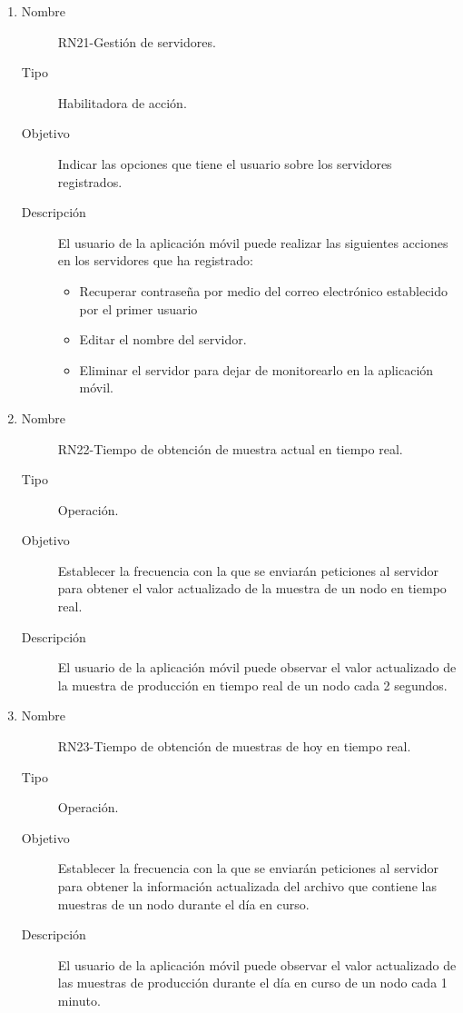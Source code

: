 \begin{enumerate}[label=RN\arabic*.]
\item \label{RN21}
		\begin{description}
			\item[Nombre] RN21-Gestión de servidores.
			\item[Tipo] Habilitadora de acción.
			\item[Objetivo] Indicar las opciones que tiene el usuario sobre los servidores registrados.
			\item[Descripción] El usuario de la aplicación móvil puede realizar las siguientes acciones en los servidores que ha registrado:
			\begin{itemize}
		 		\item Recuperar contraseña por medio del correo electrónico establecido por el primer usuario
		 		\item Editar el nombre del servidor.
		 		\item Eliminar el servidor para dejar de monitorearlo en la aplicación móvil.
		    \end{itemize}
		\end{description}
		
\item \label{RN22}
		\begin{description}
			\item[Nombre] RN22-Tiempo de obtención de muestra actual en tiempo real.
			\item[Tipo] Operación.
			\item[Objetivo] Establecer la frecuencia con la que se enviarán peticiones al servidor para obtener el valor actualizado de la muestra de un nodo en tiempo real.
			\item[Descripción] El usuario de la aplicación móvil puede observar el valor actualizado de la muestra de producción en tiempo real de un nodo cada 2 segundos.
		\end{description}
		
\item \label{RN23}
		\begin{description}
			\item[Nombre] RN23-Tiempo de obtención de muestras de hoy en tiempo real.
			\item[Tipo] Operación.
			\item[Objetivo] Establecer la frecuencia con la que se enviarán peticiones al servidor para obtener la información actualizada del archivo que contiene las muestras de un nodo durante el día en curso.
			\item[Descripción] El usuario de la aplicación móvil puede observar el valor actualizado de las muestras de producción durante el día en curso de un nodo cada 1 minuto.
		\end{description}
		
		
		
		
\end{enumerate}


